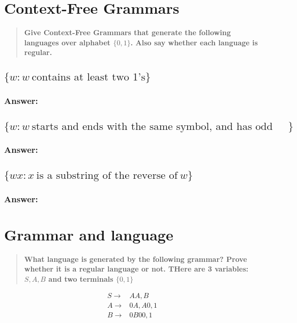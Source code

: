 \documentclass[titlepage]{article}\usepackage[]{graphicx}\usepackage[]{color}
\begin{document}

\section{Context-Free Grammars}
\begin{quote}
  \textbf{Give Context-Free Grammars that generate the following languages over
    alphabet \(\{0,1\}\). Also say whether each language is regular.}
\end{quote}
\subsection{\(\{w : w \ \mbox{contains at least two 1's}\}\)}
\subsubsection*{Answer:}
\vspace{5cm}


\subsection{\(\{w : w \ \mbox{starts and ends with the same symbol, and has odd length}\}\)}
\subsubsection*{Answer:}
\vspace{5cm}



\subsection{\(\{wx : x \ \mbox{is a substring of the reverse of} \ w\}\)}
\subsubsection*{Answer:}
\vspace{5cm}

\section{Grammar and language}
\begin{quote}
  \textbf{What language is generated by the following grammar?
    Prove whether it is a regular language or not. THere are 3 variables:
  \(S, A, B\) and two terminals \(\{0,1\}\) }
\end{quote}
\begin{align*}
  S \to& AA,B \\
  A \to& 0A, A0, 1 \\
  B \to& 0B00,1
\end{align*}
\end{document}
